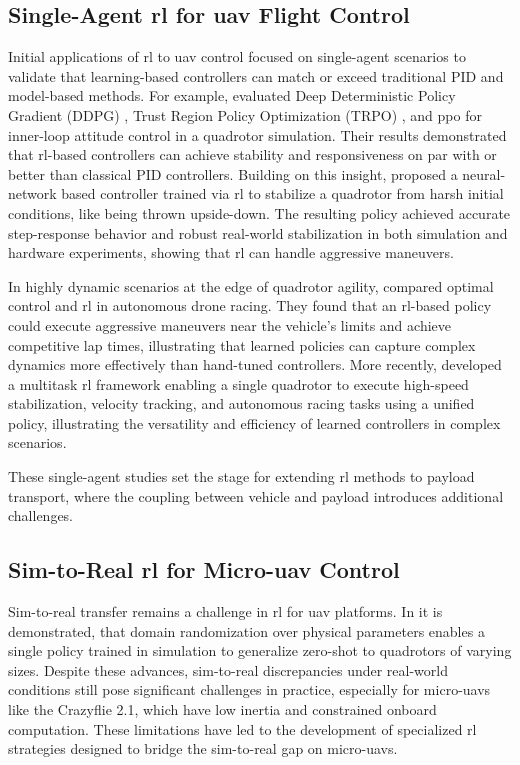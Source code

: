 \subsection{Single-Agent \gls{rl} for \gls{uav} Flight Control}

Initial applications of \gls{rl} to \gls{uav} control focused on single-agent scenarios to validate that learning-based controllers can match or exceed traditional PID and model-based methods. For example, \cite{Koch2018ReinforcementLF} evaluated Deep Deterministic Policy Gradient (DDPG) \cite{Lillicrap2015ContinuousCW}, Trust Region Policy Optimization (TRPO) \cite{Schulman2015TrustRP}, and \gls{ppo} \cite{schulman2017proximal} for inner-loop attitude control in a quadrotor simulation. Their results demonstrated that \gls{rl}-based controllers can achieve stability and responsiveness on par with or better than classical PID controllers. Building on this insight, \cite{Hwangbo2017ControlOA} proposed a neural-network based controller trained via \gls{rl} to stabilize a quadrotor from harsh initial conditions, like being thrown upside-down. The resulting policy achieved accurate step-response behavior and robust real-world stabilization in both simulation and hardware experiments, showing that \gls{rl} can handle aggressive maneuvers.

In highly dynamic scenarios at the edge of quadrotor agility, \cite{Song2023ReachingTL} compared optimal control and \gls{rl} in autonomous drone racing. They found that an \gls{rl}-based policy could execute aggressive maneuvers near the vehicle's limits and achieve competitive lap times, illustrating that learned policies can capture complex dynamics more effectively than hand-tuned controllers. More recently, \cite{xing_multi-task_2024} developed a multitask \gls{rl} framework enabling a single quadrotor to execute high-speed stabilization, velocity tracking, and autonomous racing tasks using a unified policy, illustrating the versatility and efficiency of learned controllers in complex scenarios. 

These single-agent studies set the stage for extending \gls{rl} methods to payload transport, where the coupling between vehicle and payload introduces additional challenges.

\subsection{Sim-to-Real \gls{rl} for Micro-\gls{uav} Control}
Sim-to-real transfer remains a challenge in \gls{rl} for \gls{uav} platforms. In \cite{molchanov_sim--multi-real_2019} it is demonstrated, that domain randomization over physical parameters enables a single policy trained in simulation to generalize zero-shot to quadrotors of varying sizes. Despite these advances, sim-to-real discrepancies under real-world conditions still pose significant challenges in practice, especially for micro-\glspl{uav} like the Crazyflie 2.1, which have low inertia and constrained onboard computation. These limitations have led to the development of specialized \gls{rl} strategies designed to bridge the sim-to-real gap on micro-\glspl{uav}.

